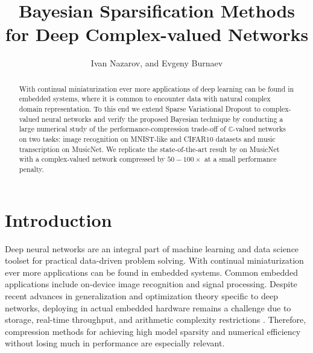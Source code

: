 \documentclass[a4paper,10pt,onecolumn]{article}
\title{Bayesian Sparsification Methods for Deep Complex-valued Networks}
\author{Ivan Nazarov, and Evgeny Burnaev}
\newcommand{\cplx}{\mathbb{C}}
\begin{document}
\maketitle

\begin{abstract}
With continual miniaturization ever more applications of deep learning can be found
in embedded systems, where it is common to encounter data with natural complex domain
representation. To this end we extend Sparse Variational Dropout to complex-valued neural
networks and verify the proposed Bayesian technique by conducting a large numerical
study of the performance-compression trade-off of $\cplx$-valued networks on two tasks:
image recognition on MNIST-like and CIFAR10 datasets and music transcription on MusicNet.
We replicate the state-of-the-art result by \citet{trabelsi_deep_2017} on MusicNet with
a complex-valued network compressed by $50-100\times$ at a small performance penalty.
\end{abstract}

\section{Introduction} %
\label{sec:introduction}

Deep neural networks are an integral part of machine learning and data science toolset
for practical data-driven problem solving. With continual miniaturization ever more
applications can be found in embedded systems. Common embedded applications include
on-device image recognition and signal processing. Despite recent advances in generalization
and optimization theory specific to deep networks, deploying in actual embedded hardware
remains a challenge due to storage, real-time throughput, and arithmetic complexity
restrictions \citep{he_amc:_2018}. Therefore, compression methods for achieving high
model sparsity and numerical efficiency without losing much in performance are especially
relevant.
\end{document}
